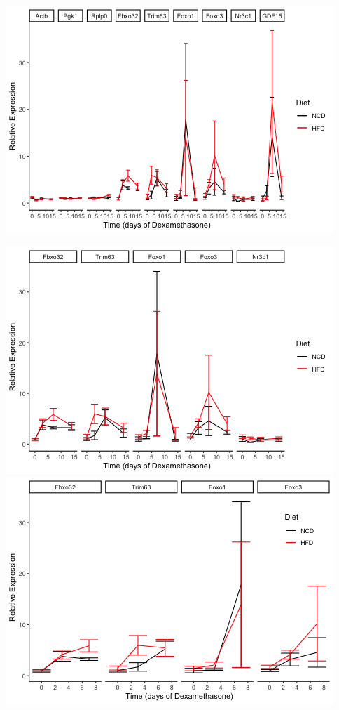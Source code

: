 \documentclass[]{article}
\begin{document}
\includegraphics{figures/lineplot-all-1.png}

\includegraphics{figures/lineplot-atrogenes-1.png}
\includegraphics{figures/lineplot-atrogenes-2.png}
\end{document}
